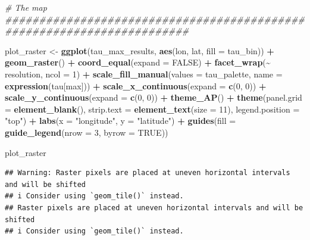 \documentclass[
  11pt,
]{article}
\newenvironment{Shaded}{\begin{snugshade}}{\end{snugshade}}
\newcommand{\AttributeTok}[1]{\textcolor[rgb]{0.13,0.29,0.53}{#1}}
\newcommand{\CommentTok}[1]{\textcolor[rgb]{0.56,0.35,0.01}{\textit{#1}}}
\newcommand{\ConstantTok}[1]{\textcolor[rgb]{0.56,0.35,0.01}{#1}}
\newcommand{\DecValTok}[1]{\textcolor[rgb]{0.00,0.00,0.81}{#1}}
\newcommand{\FunctionTok}[1]{\textcolor[rgb]{0.13,0.29,0.53}{\textbf{#1}}}
\newcommand{\NormalTok}[1]{#1}
\newcommand{\OtherTok}[1]{\textcolor[rgb]{0.56,0.35,0.01}{#1}}
\newcommand{\SpecialCharTok}[1]{\textcolor[rgb]{0.81,0.36,0.00}{\textbf{#1}}}
\newcommand{\StringTok}[1]{\textcolor[rgb]{0.31,0.60,0.02}{#1}}
\begin{document}
\begin{Shaded}
\begin{Highlighting}[]
\CommentTok{\# The map \#\#\#\#\#\#\#\#\#\#\#\#\#\#\#\#\#\#\#\#\#\#\#\#\#\#\#\#\#\#\#\#\#\#\#\#\#\#\#\#\#\#\#\#\#\#\#\#\#\#\#\#\#\#\#\#\#\#\#\#\#\#\#\#\#\#\#\#\#\#\#}

\NormalTok{plot\_raster }\OtherTok{\textless{}{-}} \FunctionTok{ggplot}\NormalTok{(tau\_max\_results, }\FunctionTok{aes}\NormalTok{(lon, lat, }\AttributeTok{fill =}\NormalTok{ tau\_bin)) }\SpecialCharTok{+}
  \FunctionTok{geom\_raster}\NormalTok{() }\SpecialCharTok{+}
  \FunctionTok{coord\_equal}\NormalTok{(}\AttributeTok{expand =} \ConstantTok{FALSE}\NormalTok{) }\SpecialCharTok{+}
  \FunctionTok{facet\_wrap}\NormalTok{(}\SpecialCharTok{\textasciitilde{}}\NormalTok{ resolution, }\AttributeTok{ncol =} \DecValTok{1}\NormalTok{) }\SpecialCharTok{+}
  \FunctionTok{scale\_fill\_manual}\NormalTok{(}\AttributeTok{values =}\NormalTok{ tau\_palette, }\AttributeTok{name =} \FunctionTok{expression}\NormalTok{(tau[max])) }\SpecialCharTok{+}
  \FunctionTok{scale\_x\_continuous}\NormalTok{(}\AttributeTok{expand =} \FunctionTok{c}\NormalTok{(}\DecValTok{0}\NormalTok{, }\DecValTok{0}\NormalTok{)) }\SpecialCharTok{+}
  \FunctionTok{scale\_y\_continuous}\NormalTok{(}\AttributeTok{expand =} \FunctionTok{c}\NormalTok{(}\DecValTok{0}\NormalTok{, }\DecValTok{0}\NormalTok{)) }\SpecialCharTok{+}
  \FunctionTok{theme\_AP}\NormalTok{() }\SpecialCharTok{+}
  \FunctionTok{theme}\NormalTok{(}\AttributeTok{panel.grid =} \FunctionTok{element\_blank}\NormalTok{(),}
        \AttributeTok{strip.text =} \FunctionTok{element\_text}\NormalTok{(}\AttributeTok{size =} \DecValTok{11}\NormalTok{),}
        \AttributeTok{legend.position =} \StringTok{"top"}\NormalTok{) }\SpecialCharTok{+}
  \FunctionTok{labs}\NormalTok{(}\AttributeTok{x =} \StringTok{"longitude"}\NormalTok{, }\AttributeTok{y =} \StringTok{"latitude"}\NormalTok{) }\SpecialCharTok{+}
  \FunctionTok{guides}\NormalTok{(}\AttributeTok{fill =} \FunctionTok{guide\_legend}\NormalTok{(}\AttributeTok{nrow =} \DecValTok{3}\NormalTok{, }\AttributeTok{byrow =} \ConstantTok{TRUE}\NormalTok{))}

\NormalTok{plot\_raster}
\end{Highlighting}
\end{Shaded}

\begin{verbatim}
## Warning: Raster pixels are placed at uneven horizontal intervals and will be shifted
## i Consider using `geom_tile()` instead.
## Raster pixels are placed at uneven horizontal intervals and will be shifted
## i Consider using `geom_tile()` instead.
\end{verbatim}
\end{document}

